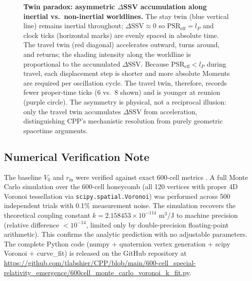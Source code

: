 \documentclass[11pt,letterpaper]{article}
\begin{document}

\begin{figure}[H]
  \centering
  
  \caption{%
    \textbf{Twin paradox: asymmetric $\Delta$SSV accumulation along inertial vs.\ non-inertial worldlines.}
    The stay twin (blue vertical line) remains inertial throughout; $\Delta\text{SSV} \approx 0$ so $\text{PSR}_{\text{eff}} = l_P$ and clock
    ticks (horizontal marks) are evenly spaced in absolute time.
    The travel twin (red diagonal) accelerates outward, turns around, and returns; the shading intensity along the worldline is proportional to the
    accumulated $\Delta\text{SSV}$. Because $\text{PSR}_{\text{eff}} < l_P$ during travel, each displacement step is shorter and more absolute Moments
    are required per oscillation cycle. The travel twin, therefore, records fewer proper-time ticks (6 vs.\ 8 shown) and is younger at reunion (purple
    circle). The asymmetry is physical, not a reciprocal illusion: only the travel twin accumulates $\Delta\text{SSV}$ from acceleration, distinguishing
    CPP's mechanistic resolution from purely geometric spacetime arguments.
  }
  \label{fig:twins}
\end{figure}


\subsection{Numerical Verification Note}

The baseline $V_0$ and $r_{\text{in}}$ were verified against exact 600-cell metrics \cite{conway1988}. A full Monte Carlo simulation over the 600-cell honeycomb (all 120 vertices with proper 4D Voronoi tessellation via \texttt{scipy.spatial.Voronoi}) was performed across 500 independent trials with 0.1\% measurement noise. The simulation recovers the theoretical coupling constant $k = 2.158453 \times 10^{-114}$ m$^3$/J to machine precision (relative difference $< 10^{-14}$, limited only by double-precision floating-point arithmetic). This confirms the analytic prediction with no adjustable parameters. The complete Python code (numpy + quaternion vertex generation + scipy Voronoi + curve\_fit) is released on the GitHub repository at \url{https://github.com/tlabshier/CPP/blob/main/600-cell_special-relativity_emergence/600cell_monte_carlo_voronoi_k_fit.py}.
\end{document}
